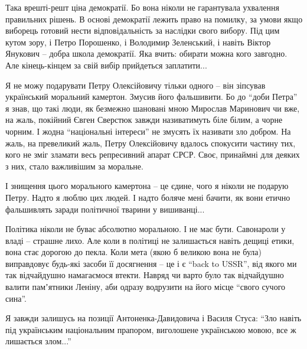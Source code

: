 Така врешті-решт ціна демократії. Бо вона ніколи не гарантувала ухвалення
правильних рішень. В основі демократії лежить право на помилку, за умови якщо
виборець готовий нести відповідальність за наслідки свого вибору. Під цим кутом
зору, і Петро Порошенко, і Володимир Зеленський, і навіть Віктор Янукович –
добра школа демократії. Яка вчить: обирати можна кого завгодно. Але
кінець-кінцем за свій вибір прийдеться заплатити...

Я не можу подарувати Петру Олексійовичу тільки одного – він зіпсував
український моральний камертон. Змусив його фальшивити. Бо до \enquote{доби Петра} я
знав, що такі люди, як безмежно шановані мною Мирослав Маринович чи вже, на
жаль, покійний Євген Сверстюк завжди називатимуть біле білим, а чорне чорним. І
жодна \enquote{національні інтереси} не змусять їх називати зло добром. На жаль, на
превеликий жаль, Петру Олексійовичу вдалось спокусити частину тих, кого не зміг
зламати весь репресивний апарат СРСР. Своє, принаймні для деяких з них, стало
важливішим за моральне.

І знищення цього морального камертона – це єдине, чого я ніколи не подарую
Петру. Надто я люблю цих людей. І надто боляче мені бачити, як вони етично
фальшивлять заради політичної тварини у вишиванці...

Політика ніколи не буває абсолютно моральною. І не має бути. Савонароли у владі
– страшне лихо. Але коли в політиці не залишається навіть дещиці етики, вона
стає дорогою до пекла. Коли мета (якою б великою вона не була) виправдовує
будь-які засоби її досягнення – це і є \enquote{back to USSR}, від якого ми так
відчайдушно намагаємося втекти. Навряд чи варто було так відчайдушно валити
памʼятники Леніну, аби одразу водрузити на його місце \enquote{свого сучого сина}.

Я завжди залишусь на позиції Антоненка-Давидовича і Василя Стуса: \enquote{Зло навіть
під українським національним прапором, виголошене українською мовою, все ж
лишається злом...}
